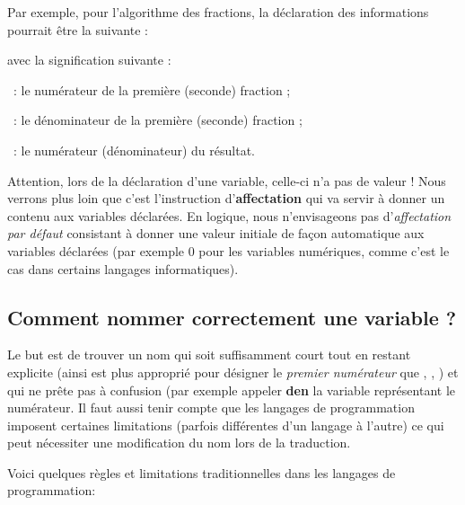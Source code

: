 			Par exemple, pour l’algorithme des fractions, la déclaration des
			informations pourrait être la suivante :


			avec la signification suivante :

			\begin{liste}
			\item
				~: le numérateur 
				de la première (seconde) fraction ;
			\item
				~: le dénominateur 
				de la première (seconde) fraction ;
			\item
				~:
				le numérateur (dénominateur) du résultat.
			\end{liste}
			
			Attention, lors de la déclaration d’une variable, celle-ci n’a pas de
			valeur ! Nous verrons plus loin que c’est l’instruction
			d’\textbf{affectation} qui va servir à donner un contenu aux variables
			déclarées. En logique, nous n’envisageons pas d’\textit{affectation par
			défaut} consistant à donner une valeur initiale de façon automatique
			aux variables déclarées (par exemple 0 pour les variables numériques,
			comme c’est le cas dans certains langages informatiques).

		\subsection{Comment nommer correctement une variable ?}

			Le but est de trouver un nom qui soit suffisamment court tout en restant
			explicite (ainsi  est plus approprié pour
			désigner le \textit{premier numérateur }que ,
			, ) et qui ne prête pas à confusion (par exemple
			appeler \textbf{den} la variable représentant le numérateur.
			Il faut aussi tenir compte que les
			langages de programmation imposent certaines limitations (parfois
			différentes d'un langage à l'autre)
			ce qui peut nécessiter une modification du nom lors de la traduction.

			Voici quelques règles et limitations traditionnelles dans les langages
			de programmation:

